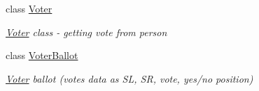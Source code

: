 \begin{DoxyCompactItemize}
\item 
class \hyperlink{class_voter_1_1_voter}{Voter}
\begin{DoxyCompactList}\small\item\em \hyperlink{class_voter_1_1_voter}{Voter} class -\/ getting vote from person \end{DoxyCompactList}\item 
class \hyperlink{class_voter_1_1_voter_ballot}{Voter\+Ballot}
\begin{DoxyCompactList}\small\item\em \hyperlink{class_voter_1_1_voter}{Voter} ballot (vote\textquotesingle{}s data as S\+L, S\+R, vote, yes/no position) \end{DoxyCompactList}\end{DoxyCompactItemize}
